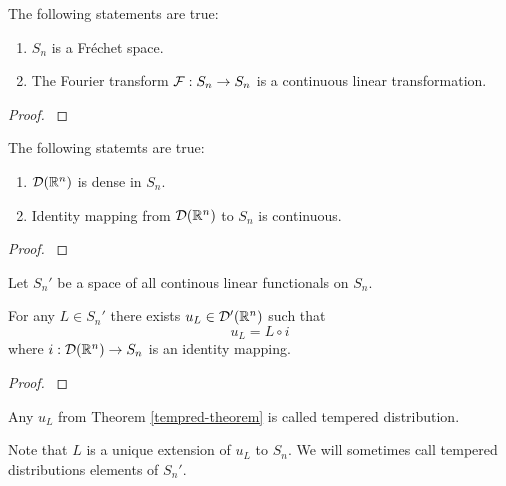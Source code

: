 \documentclass[main.tex]{subfiles}
\begin{document}
\begin{theorem}
\label{tempered-fretchet}
The following statements are true:
\begin{enumerate}
\item $S_n$ is a Fr\'echet space.
\item The Fourier transform $\mathcal{F}:S_n\to S_n$ is a continuous linear transformation.
\end{enumerate}
\end{theorem}
\begin{proof}
\cite[see][7.4]{rudin1991}
\end{proof}
\begin{theorem}
The following statemts are true:
\begin{enumerate}
\item $\mathcal{D}(\mathbb{R}^n)$ is dense in $S_n$.
\item Identity mapping from $\mathcal{D}(\mathbb{R}^n)$ to $S_n$ is continuous. 
\end{enumerate}
\end{theorem}
\begin{proof}
\cite[see][7.10]{rudin1991}
\end{proof}
Let $S_n'$ be a space of all continous linear functionals on $S_n$.
\begin{theorem}
\label{tempred-theorem}
For any $L\in S_n'$ there exists $u_L\in \mathcal{D}'(\mathbb{R}^n)$ such that
\begin{equation}
u_L = L \circ i
\end{equation}
where $i:\mathcal{D}(\mathbb{R}^n)\to S_n$ is an identity mapping.  
\end{theorem}
\begin{proof}
\cite[see][7.11]{rudin1991}
\end{proof}
\begin{definition}
Any $u_L$ from Theorem \ref{tempred-theorem} is called tempered distribution.
\end{definition}
Note that $L$ is a unique extension of $u_L$ to $S_n$. We will sometimes call tempered distributions elements of $S_n'$.
\end{document}

